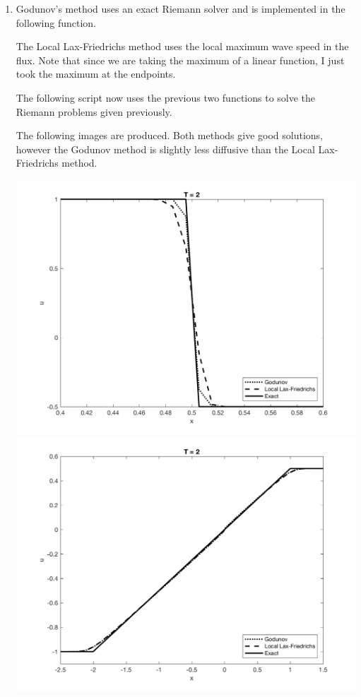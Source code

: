 \documentclass[11pt, oneside]{article}
\begin{document}
\begin{enumerate}
  \item %
    Godunov's method uses an exact Riemann solver and is implemented in the
    following function.
    
    The Local Lax-Friedrichs method uses the local maximum wave speed in the
    flux.
    Note that since we are taking the maximum of a linear function, I just took
    the maximum at the endpoints.
    
    The following script now uses the previous two functions to solve the
    Riemann problems given previously.
    
    The following images are produced.
    Both methods give good solutions, however the Godunov method is slightly
    less diffusive than the Local Lax-Friedrichs method.
    \begin{center}
      \includegraphics[scale=0.8]{Figures/04_01.png}
      \includegraphics[scale=0.8]{Figures/04_02.png}
    \end{center}

\end{enumerate}
\end{document}
